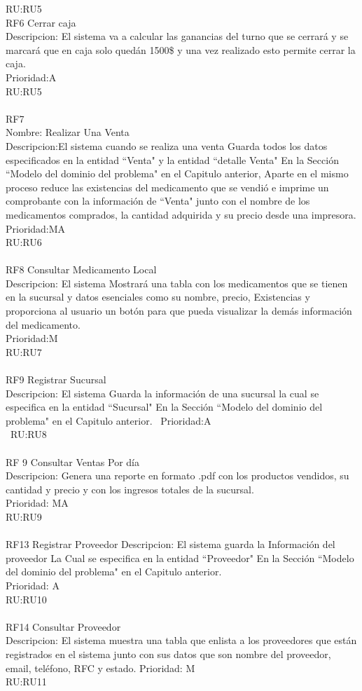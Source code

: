 RU:RU5
\\
RF6 Cerrar caja\\
Descripcion: El sistema va a calcular las ganancias del turno que se cerrará y se marcará que en caja solo quedán 1500\$ y una vez realizado esto permite cerrar la caja.\\
Prioridad:A\\
RU:RU5\\
\\
RF7\\
Nombre: Realizar Una Venta\\
Descripcion:El sistema cuando se realiza una venta Guarda todos los datos especificados en la entidad ``Venta" y la entidad ``detalle Venta" En la Sección ``Modelo del dominio del problema" en el  Capitulo anterior, Aparte en el mismo proceso reduce las existencias del medicamento que se vendió e imprime un comprobante con la información de ``Venta" junto con el nombre de los medicamentos comprados, la cantidad adquirida y su precio desde una impresora.\\
Prioridad:MA\\
RU:RU6\\
\\
RF8 Consultar Medicamento Local\\
Descripcion: El sistema Mostrará una tabla con los medicamentos que se tienen en la sucursal y datos esenciales como su nombre, precio, Existencias y proporciona al usuario un botón para que pueda visualizar la demás información del medicamento.\\
Prioridad:M\\
RU:RU7\\
\\
RF9 Registrar Sucursal\\
Descripcion: El sistema Guarda la información de una sucursal la cual se especifica en la entidad ``Sucursal" En la Sección ``Modelo del dominio del problema" en el  Capitulo anterior. \
Prioridad:A\\\
RU:RU8\\
\\
RF 9 Consultar Ventas Por día\\
Descripcion: Genera una reporte en formato .pdf con los productos vendidos, su cantidad y precio y con los ingresos totales de la sucursal.\\
Prioridad: MA\\
RU:RU9\\
\\
RF13 Registrar Proveedor
Descripcion: El sistema guarda la Información del proveedor La Cual se especifica en la entidad ``Proveedor" En la Sección ``Modelo del dominio del problema" en el  Capitulo anterior.\\
Prioridad: A\\
RU:RU10\\
\\
RF14 Consultar Proveedor\\
Descripcion: El sistema muestra una tabla que enlista a los proveedores que están registrados en el sistema junto con sus datos que son nombre del proveedor, email, teléfono, RFC y estado.
Prioridad: M\\
RU:RU11\\
\newpage

